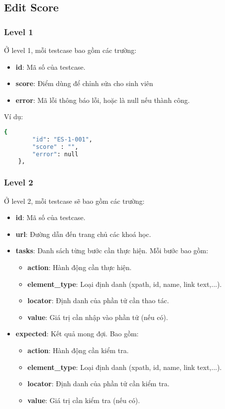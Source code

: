 \subsection{Edit Score}
\subsubsection{Level 1}
Ở level 1, mỗi testcase bao gồm các trường:
\begin{itemize}
    \item \textbf{id}: Mã số của testcase.
    \item \textbf{score}: Điểm dùng để chỉnh sửa cho sinh viên
    \item \textbf{error}: Mã lỗi thông báo lỗi, hoặc là null nếu thành công.
\end{itemize}

Ví dụ:
\begin{lstlisting}[language=bash, caption={Ví dụ testcase ES-1-001 ở level 1}]
    {
        "id": "ES-1-001",
        "score" : "",
        "error": null  
    },
\end{lstlisting}

\subsubsection{Level 2}

Ở level 2, mỗi testcase sẽ bao gồm các trường:
\begin{itemize}
    \item \textbf{id}: Mã số của testcase.
    \item \textbf{url}: Đường dẫn đến trang chủ các khoá học.
    \item \textbf{tasks}: Danh sách từng bước cần thực hiện. Mỗi bước bao gồm:
\begin{itemize}
    \item \textbf{action}: Hành động cần thực hiện.
    \item \textbf{element\_type}: Loại định danh (xpath, id, name, link text,...).
    \item \textbf{locator}: Định danh của phần tử cần thao tác.
    \item \textbf{value}: Giá trị cần nhập vào phần tử (nếu có).
\end{itemize}
    \item \textbf{expected}: Kết quả mong đợi. Bao gồm:
\begin{itemize}
    \item \textbf{action}: Hành động cần kiểm tra.
    \item \textbf{element\_type}: Loại định danh (xpath, id, name, link text,...).
    \item \textbf{locator}: Định danh của phần tử cần kiểm tra.
    \item \textbf{value}: Giá trị cần kiểm tra (nếu có).
\end{itemize}
\end{itemize}

